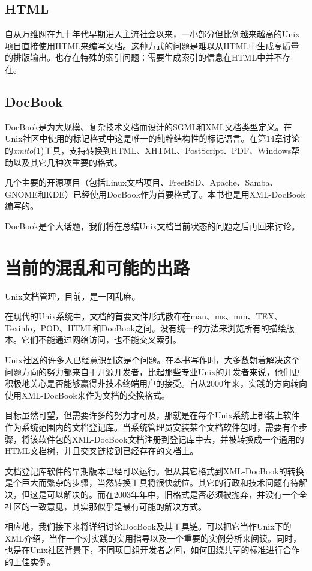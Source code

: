 \documentclass[12pt,oneside]{ctexbook}
\begin{document}
\begin{common-format}
\subsection{HTML}
自从万维网在九十年代早期进入主流社会以来，一小部分但比例越来越高的Unix项目直接使用HTML来编写文档。这种方式的问题是难以从HTML中生成高质量的排版输出。也存在特殊的索引问题：需要生成索引的信息在HTML中并不存在。

\subsection{DocBook}
DocBook是为大规模、复杂技术文档而设计的SGML和XML文档类型定义。在Unix社区中使用的标记格式中这是唯一的纯粹结构性的标记语言。在第14章讨论的\textit{xmlto}(1)工具，支持转换到HTML、XHTML、PostScript、PDF、Windows帮助以及其它几种次重要的格式。

几个主要的开源项目（包括Linux文档项目、FreeBSD、Apache、Samba、GNOME和KDE）已经使用DocBook作为首要格式了。本书也是用XML-DocBook编写的。

DocBook是个大话题，我们将在总结Unix文档当前状态的问题之后再回来讨论。

\section{当前的混乱和可能的出路}
Unix文档管理，目前，是一团乱麻。

在现代的Unix系统中，文档的首要文件形式散布在man、ms、mm、TEX、Texinfo，POD、HTML和DocBook之间。没有统一的方法来浏览所有的描绘版本。它们不能通过网络访问，也不能交叉索引。

Unix社区的许多人已经意识到这是个问题。在本书写作时，大多数朝着解决这个问题方向的努力都来自于开源开发者，比起那些专业Unix的开发者来说，他们更积极地关心是否能够赢得非技术终端用户的接受。自从2000年来，实践的方向转向使用XML-DocBook来作为文档的交换格式。

目标虽然可望，但需要许多的努力才可及，那就是在每个Unix系统上都装上软件作为系统范围内的文档登记库。当系统管理员安装某个文档软件包时，需要有个步骤，将该软件包的XML-DocBook文档注册到登记库中去，并被转换成一个通用的HTML文档树，并且交叉链接到已经存在的文档上。

文档登记库软件的早期版本已经可以运行。但从其它格式到XML-DocBook的转换是个巨大而繁杂的步骤，当然转换工具将很快就位。其它的行政和技术问题有待解决，但这是可以解决的。而在2003年年中，旧格式是否必须被抛弃，并没有一个全社区的一致意见，其实那似乎是最有可能的解决方式。

相应地，我们接下来将详细讨论DocBook及其工具链。可以把它当作Unix下的XML介绍，当作一个对实践的实用指导以及一个重要的实例分析来阅读。同时，也是在Unix社区背景下，不同项目组开发者之间，如何围绕共享的标准进行合作的上佳实例。


\end{common-format}
\end{document}
